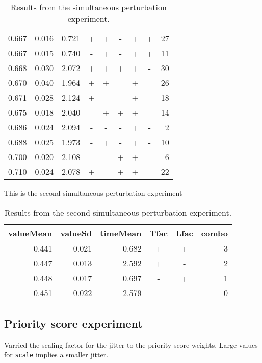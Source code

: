 \documentclass[11pt]{article}
\begin{document}
\begin{table}[ht]
\begin{tabular}{rrrcccccr}
  0.667 & 0.016 & 0.721 & + & + & - & + & + & 27 \\ 
  0.667 & 0.015 & 0.740 & - & + & - & + & + & 11 \\ 
  0.668 & 0.030 & 2.072 & + & + & + & + & - & 30 \\ 
  0.670 & 0.040 & 1.964 & + & + & - & + & - & 26 \\ 
  0.671 & 0.028 & 2.124 & + & - & - & + & - & 18 \\ 
  0.675 & 0.018 & 2.040 & - & + & + & + & - & 14 \\ 
  0.686 & 0.024 & 2.094 & - & - & - & + & - & 2 \\ 
  0.688 & 0.025 & 1.973 & - & + & - & + & - & 10 \\ 
  0.700 & 0.020 & 2.108 & - & - & + & + & - & 6 \\ 
  0.710 & 0.024 & 2.078 & + & - & + & + & - & 22 \\ 
   \hline
\end{tabular}
\caption{Results from the simultaneous perturbation experiment.} 
\end{table}


This is the second simultaneous perturbation experiment


\begin{table}[ht]
\centering
\begin{tabular}{rrrccr}
  \hline
valueMean & valueSd & timeMean & Tfac & Lfac & combo \\ 
  \hline
0.441 & 0.021 & 0.682 & + & + & 3 \\ 
  0.447 & 0.013 & 2.592 & + & - & 2 \\ 
  0.448 & 0.017 & 0.697 & - & + & 1 \\ 
  0.451 & 0.022 & 2.579 & - & - & 0 \\ 
   \hline
\end{tabular}
\caption{Results from the second simultaneous perturbation experiment.} 
\end{table}


\newpage


\subsection{Priority score experiment}
\label{sec-5-2}

Varried the scaling factor for the jitter to the priority score
weights.  Large values for \texttt{scale} implies a smaller jitter.
\end{document}
